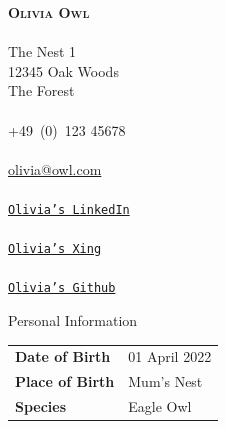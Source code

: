 \documentclass[lightstylish]{stylishcv} %
\begin{document}
		\begin{center}
			{\bfseries \scshape Olivia Owl}\\[\baselineskip]
			{\color{accentcolor}{\faMapMarker}}\\The Nest 1\\12345 Oak Woods\\The Forest\\[\baselineskip]
			{\color{accentcolor}{\faMobile}}\\+49~(0)~123 45678\\[\baselineskip]
			{\color{accentcolor}{\faEnvelopeO}}\\\href{mailto:olivia@owl.com}{olivia@owl.com}\\[\baselineskip]
			{\color{accentcolor}{\faLinkedinSquare}}\\\href{http://linkedin.com}{\texttt{Olivia's LinkedIn}}\\[\baselineskip]
			{\color{accentcolor}{\faXingSquare}}\\\href{http://xing.de}{\texttt{Olivia's Xing}}\\[\baselineskip]
			{\color{accentcolor}{\faGithubSquare}}\\\href{https://github.com/}{\texttt{Olivia's Github}}\\[\baselineskip]

			\vspace{0.25cm}
			\dottedsidebarline
			\vspace{0.5cm}
		\end{center}


		\begin{center}
			\begin{darkshadedcvbox}Personal Information\end{darkshadedcvbox}
		\end{center}
		\begin{tabular}{L{1.35cm}  R{2.05cm}}
			\hspace{-0.45cm}\textbf{Date of Birth}& 01 April 2022\\
			\hspace{-0.45cm}\textbf{Place of Birth} & Mum's Nest\\
			\hspace{-0.45cm}\textbf{Species} & Eagle Owl\\
		\end{tabular}
		\smallskip
\end{document}
